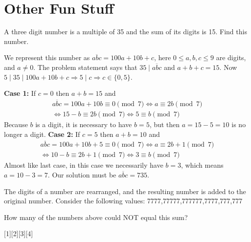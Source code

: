 \newpageSol
\section{Other Fun Stuff}\setcounter{problem}{0}

\begin{problem}
    A three digit number is a multiple of 35 and the sum of its digits is 15. Find this number.
\end{problem}

\begin{solution}[735]
    We represent this number as $\overline{abc} = 100a+10b+c$, here $0 \leq a,b,c \leq 9$ are digits, and $a \neq 0$. The problem statement says that $35 \mid \overline{abc}$ and $a+b+c = 15$. Now $5 \mid 35 \mid 100a+10b+c \Rightarrow 5 \mid c \Rightarrow c\in \{0,5\}$.
    
    \textbf{Case 1:} If $c = 0$ then $a+b=15$ and 
    \begin{align*}
        \overline{abc} = 100a + 10b \equiv 0 \pmod {7} \iff a \equiv 2b \pmod{7} \\
        \iff 15 - b \equiv 2b \pmod{7} \iff 5 \equiv b \pmod{7}    
    \end{align*}
     Because $b$ is a digit, it is necessary to have $b=5$, but then $a=15-5=10$ is no longer a digit.
     \textbf{Case 2:} If $c=5$ then $a+b = 10$ and 
     \begin{align*}
         \overline{abc} = 100a + 10b + 5 \equiv 0 \pmod {7} \iff a \equiv 2b + 1 \pmod{7} \\
         \iff 10 - b \equiv 2b+1 \pmod{7} \iff 3 \equiv b \pmod{7}
     \end{align*}
     Almost like last case, in this case we necessarily have $b=3$, which means $a=10-3=7$. Our solution must be $\overline{abc} = \boxed{735}.$
\end{solution}

\begin{problem}
    The digits of a number are rearranged, and the resulting number is added to the original number. Consider the following values:\smallbreak
    \hspace{25pt}777\hfill7,777\hfill77,777\hfill777,777\hfill7,777,777\hspace{25pt}\smallbreak

    How many of the numbers above could NOT equal this sum?
    \end{problem}
    [1][2][3][4]

